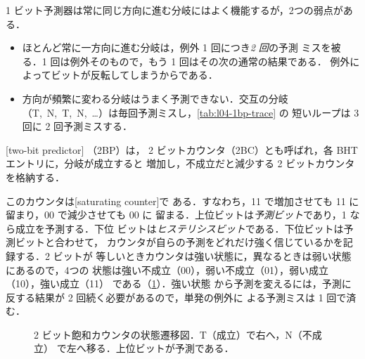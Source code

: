 \documentclass[../main.tex]{subfiles}
\begin{document}
1 ビット予測器は常に同じ方向に進む分岐にはよく機能するが，2つの弱点がある．
\begin{itemize}
  \item ほとんど常に一方向に進む分岐は，例外 1 回につき\emph{2 回}の予測
    ミスを被る．1 回は例外そのもので，もう 1 回はその次の通常の結果である．
    例外によってビットが反転してしまうからである．
  \item 方向が頻繁に変わる分岐はうまく予測できない．交互の分岐
    （T,~N,~T,~N,~\ldots）は毎回予測ミスし，\cref{tab:l04-1bp-trace} の
    短いループは 3 回に 2 回予測ミスする．
\end{itemize}

\begin{definition}[2 ビット予測器]
  [two-bit predictor]%
  （2BP）は，
  2 ビットカウンタ（2BC）とも呼ばれ，各 BHT エントリに，分岐が成立すると
  増加し，不成立だと減少する 2 ビットカウンタを格納する．
\end{definition}

このカウンタは[saturating counter]で
ある．すなわち，11 で増加させても 11 に留まり，00 で減少させても 00 に
留まる．上位ビットは\emph{予測ビット}であり，1 なら成立を予測する．下位
ビットは\emph{ヒステリシスビット}である．下位ビットは予測ビットと合わせて，
カウンタが自らの予測をどれだけ強く信じているかを記録する．2 ビットが
等しいときカウンタは強い状態に，異なるときは弱い状態にあるので，4つの
状態は強い不成立（00），弱い不成立（01），弱い成立（10），強い成立（11）
である（\cref{fig:l04-2bc}）．強い状態
から予測を変えるには，予測に反する結果が 2 回続く必要があるので，単発の例外に
よる予測ミスは 1 回で済む．

\begin{figure}[htbp]
  \centering
  
  \caption{2 ビット飽和カウンタの状態遷移図．T（成立）で右へ，N（不成立）
    で左へ移る．上位ビットが予測である．}
  \label{fig:l04-2bc}
\end{figure}
\end{document}
